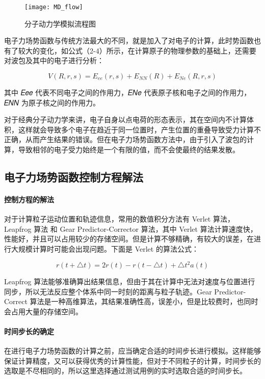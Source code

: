  \begin{figure}[h]
  \centering
  \texttt{[image: MD\_flow]}
  \caption{分子动力学模拟流程图}
\end{figure}

 电子力场势函数与传统方法最大的不同，就是加入了对电子的计算，此时势函数也有了较大的变化，如公式（2-4）所示，在计算原子的物理参数的基础上，还需要对波包及其中的电子进行分析：

 \begin{equation}
   V(R,r,s)=E_{ee}(r,s)+E_{NN}(R)+E_{Ne}(R,r,s)
\end{equation}

其中 𝐸𝑒𝑒 代表不同电子之间的作用力，𝐸𝑁𝑒 代表原子核和电子之间的作用力，𝐸𝑁𝑁 为原子核之间的作用力。

对于经典分子动力学来讲，电子自身以点电荷的形态表示，其在空间内不计算体积，这样就会导致多个电子在趋近于同一位置时，产生位置的重叠导致受力计算不正确，从而产生结果的错误。但在电子力场势函数方法中，由于引入了波包的计算，导致相邻的电子受力始终是一个有限的值，而不会使最终的结果发散。


\subsection{电子力场势函数控制方程解法}
\paragraph{控制方程的解法}
对于计算粒子运动位置和轨迹信息，常用的数值积分方法有 Verlet 算法， Leapfrog 算法\cite{hut1995building} 和 Gear Predictor-Corrector 算法\cite{gear1967numerical}，其中 Verlet 算法计算速度快，性能好，并且可以占用较少的存储空间。但是计算不够精确，有较大的误差，在进行大规模计算时可能会出现问题。下面是 Verlet 的算法公式：

\begin{equation}
  r(t+\triangle t)=2r(t)-r(t-\triangle t)+\triangle t^2a(t)
  \end{equation}

Leapfrog 算法能够准确算出结果信息，但由于其在计算中无法对速度与位置进行同步，所以无法反应整个体系中同一时刻的距离与粒子轨迹。Gear Predictor-Correct 算法是一种高维算法，其结果准确性高，误差小，但是比较费时，也同时会占用大量的存储空间。

\paragraph{时间步长的确定}
在进行电子力场势函数的计算之前，应当确定合适的时间步长进行模拟。这样能够保证计算精度，又可以获得优秀的计算性能，但对于不同粒子的计算，时间步长的选取是不尽相同的，所以这里选择通过测试用例的实时选取合适的时间步长。

